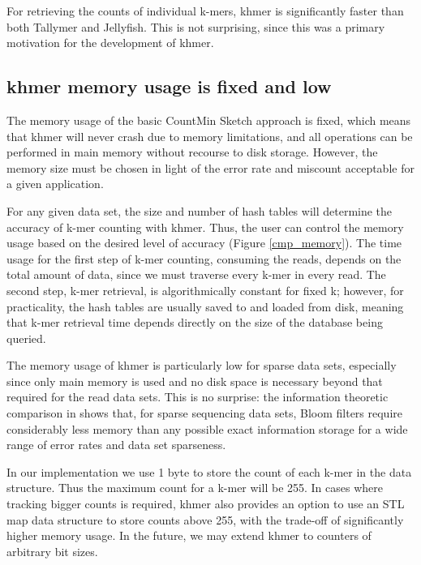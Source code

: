 \documentclass{article}
\begin{document}
For retrieving the counts of individual k-mers, khmer is significantly faster than both
Tallymer and Jellyfish.  This is not surprising, since this was a
primary motivation for the development of khmer.

\subsection{khmer memory usage is fixed and low}

The memory usage of the basic CountMin Sketch approach is fixed, which
means that khmer will never crash due to memory limitations, and all
operations can be performed in main memory without recourse to disk
storage.  However, the memory size must be chosen in light
of the error rate and miscount acceptable for a given
application.

For any given data set, the size and number of hash tables will
determine the accuracy of k-mer counting with khmer.  Thus, the user
can control the memory usage based on the desired level of
accuracy (Figure \ref{cmp_memory}). The time usage for the first step of k-mer counting,
consuming the reads, depends on the
total amount of data, since we must traverse every k-mer in every read.
The second step, k-mer retrieval, is algorithmically constant for
fixed k; however, for practicality, the hash tables are usually saved
to and loaded from disk, meaning that k-mer retrieval time depends directly
on the size of the database being queried.

The memory usage of khmer is particularly low for sparse data sets,
especially since only main memory is used and no disk space is
necessary beyond that required for the read data sets.  This is no
surprise: the information theoretic comparison in
\cite{Pell2012} shows that, for sparse sequencing data sets, Bloom
filters require considerably less memory than any possible exact
information storage for a wide range of error rates and data set
sparseness.

In our implementation we use 1 byte to store the count of each k-mer
in the data structure. Thus the maximum count for a k-mer will be 255.
In cases where tracking bigger counts is required, khmer also provides
an option to use an STL map data structure to store counts above 255,
with the trade-off of significantly higher memory usage.  In the
future, we may extend khmer to counters of arbitrary bit sizes.

\end{document}
